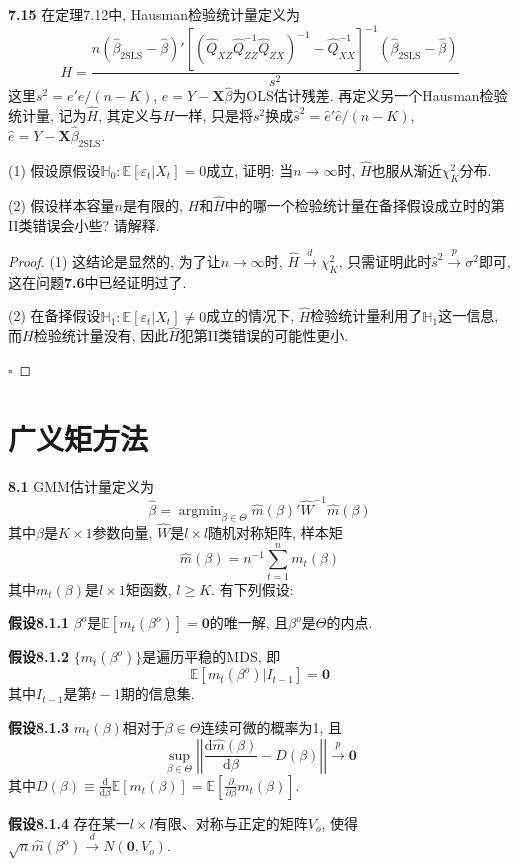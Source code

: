 \documentclass[cn,12pt,math=mtpro2,citestyle=gb7714-2015,bibstyle=gb7714-2015,twocol,mode=simple]{elegantbook}
\newcommand{\HH}{\mathbb{H}}
\newcommand{\E}{\mathbb{E}}
\newcommand{\hbeta}{\hat{\beta}}
\newcommand{\btls}{\hat{\beta}_{\text{2SLS}}}
\newcommand{\QXZ}{\hat{Q}_{XZ}}
\newcommand{\QZZ}{\hat{Q}_{ZZ}}
\newcommand{\QZX}{\hat{Q}_{ZX}}
\begin{document}
\textbf{7.15} 在定理7.12中, Hausman检验统计量定义为
$$H=\frac{n(\btls-\hat{\beta})'\left[(\QXZ\QZZ^{-1}\QZX)^{-1}-\hat{Q}_{XX}^{-1}\right]^{-1}(\btls-\hat{\beta})}{s^2}$$
这里$s^2=e'e/(n-K)$, $e=Y-\mathbf{X}\hbeta$为OLS估计残差. 再定义另一个Hausman检验统计量, 记为$\hat{H}$, 其定义与$H$一样, 只是将$s^2$换成$\hat{s}^2=\hat{e}'\hat{e}/(n-K)$, $\hat{e}=Y-\mathbf{X}\btls$.

(1) 假设原假设$\HH_0: \E[\varepsilon_t|X_t]=0$成立, 证明: 当$n\to\infty$时, $\hat{H}$也服从渐近$\chi^2_K$分布.

(2) 假设样本容量$n$是有限的, $H$和$\hat{H}$中的哪一个检验统计量在备择假设成立时的第II类错误会小些? 请解释.

\begin{proof}
  (1) 这结论是显然的, 为了让$n\to\infty$时, $\hat{H}\xrightarrow{d}\chi_K^2$, 只需证明此时$\hat{s}^2\xrightarrow{p}\sigma^2$即可, 这在问题\textbf{7.6}中已经证明过了.

  (2) 在备择假设$\HH_1: \E[\varepsilon_t|X_t]\neq0$成立的情况下, $\hat{H}$检验统计量利用了$\HH_1$这一信息, 而$H$检验统计量没有, 因此$\hat{H}$犯第II类错误的可能性更小.

  $\square$
\end{proof}

\chapter*{广义矩方法}
\textbf{8.1} GMM估计量定义为
$$\hbeta=\mathop{\arg\min}_{\beta\in\Theta}\hat{m}(\beta)'\hat{W}^{-1}\hat{m}(\beta)$$
其中$\beta$是$K\times1$参数向量, $\hat{W}$是$l\times l$随机对称矩阵, 样本矩
$$\hat{m}(\beta)=n^{-1}\sum_{t=1}^{n}m_t(\beta)$$
其中$m_t(\beta)$是$l\times 1$矩函数, $l\geq K$. 有下列假设:

\textbf{假设8.1.1} $\beta^o$是$\E[m_t(\beta^o)]=\mathbf{0}$的唯一解, 且$\beta^o$是$\Theta$的内点.

\textbf{假设8.1.2} $\{m_t(\beta^o)\}$是遍历平稳的MDS, 即
$$\E[m_t(\beta^o)|I_{t-1}]=\mathbf{0}$$
其中$I_{t-1}$是第$t-1$期的信息集.

\textbf{假设8.1.3} $m_t(\beta)$相对于$\beta\in\Theta$连续可微的概率为1, 且
$$\sup_{\beta\in\Theta}\left|\left|\frac{\text{d}\hat{m}(\beta)}{\text{d}\beta}-D(\beta)\right|\right|\xrightarrow{p}\mathbf{0}$$
其中$\displaystyle D(\beta)\equiv\frac{\text{d}}{\text{d}\beta}\E[m_t(\beta)]=\E\left[\frac{\partial}{\partial \beta}m_t(\beta)\right]$.

\textbf{假设8.1.4} 存在某一$l\times l$有限、对称与正定的矩阵$V_o$, 使得$\sqrt{n}\hat{m}(\beta^o)\xrightarrow{d}N(\mathbf{0},V_o)$.
\end{document}
